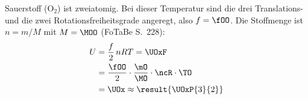 Sauerstoff (O$_2$) ist zweiatomig. Bei dieser Temperatur sind die drei Translations- und die zwei Rotationsfreiheitsgrade angeregt, also $f = \fOO$. Die Stoffmenge ist $n = m/M$ mit $M = \MOO$ (FoTaBe S.~228):
\begin{align}
 U &= \frac{f}{2}\,nRT = \UOxF \\
   &= \frac{\fOO}{2}\cdot\frac{\mO}{\MO}\cdot\ncR\cdot\TO \\
   &= \UOx \approx \result{\UOxP{3}{2}}
\end{align}
